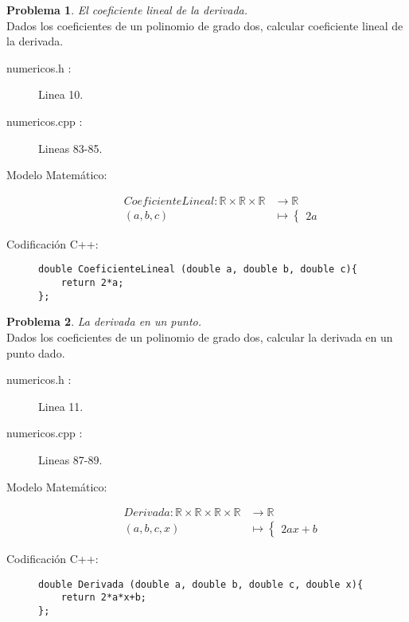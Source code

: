 \documentclass{article}
\theoremstyle{plain}
\theoremstyle{definition}
\newtheorem{problem}{Problema}
\begin{document}
\begin{problem} \emph{El coeficiente lineal de la derivada.}\\
\hspace*{7mm}Dados los coeficientes de un polinomio de grado dos, calcular coeficiente lineal de la derivada.
%
\begin{description}
\item[numericos.h :] Linea 10. \item[numericos.cpp :] Lineas 83-85.
\item[Modelo Matemático:]
\begin{align*}
CoeficienteLineal: \mathbb{R}\times\mathbb{R}\times\mathbb{R} &\to \mathbb{R}\\
(a,b,c) &\mapsto \begin{cases}
2a
\end{cases}
\end{align*}
%
\item[Codificación \textsf{C++}:]\hfill
%
\begin{verbatim}
double CoeficienteLineal (double a, double b, double c){
    return 2*a;
};
\end{verbatim}
\end{description}
\end{problem}

\begin{problem} \emph{La derivada en un punto.}\\
\hspace*{7mm}Dados los coeficientes de un polinomio de grado dos, calcular la derivada en un punto dado.
%
\begin{description}
\item[numericos.h :] Linea 11. \item[numericos.cpp :] Lineas 87-89.

\item[Modelo Matemático:]
\begin{align*}
Derivada: \mathbb{R}\times\mathbb{R}\times\mathbb{R}\times\mathbb{R} &\to \mathbb{R}\\
(a,b,c,x) &\mapsto \begin{cases}
2ax+b
\end{cases}
\end{align*}
%
\item[Codificación \textsf{C++}:]\hfill
%
\begin{verbatim}
double Derivada (double a, double b, double c, double x){
    return 2*a*x+b;
};
\end{verbatim}
\end{description}
\end{problem}
\end{document}
